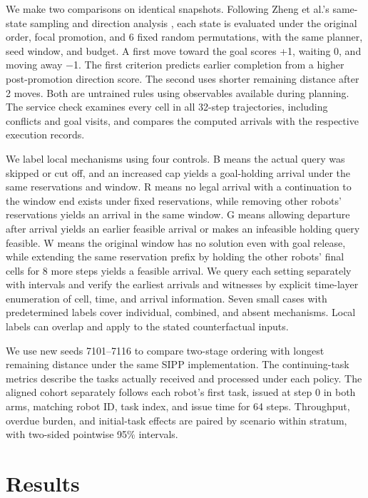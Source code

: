 \documentclass{article}
\begin{document}
We make two comparisons on identical snapshots. Following Zheng et al.'s same-state sampling and direction analysis \citep[Sec.~6]{zheng2026}, each state is evaluated under the original order, focal promotion, and 6 fixed random permutations, with the same planner, seed window, and budget. A first move toward the goal scores +1, waiting 0, and moving away \ensuremath{-}1. The first criterion predicts earlier completion from a higher post-promotion direction score. The second uses shorter remaining distance after 2 moves. Both are untrained rules using observables available during planning. The service check examines every cell in all 32-step trajectories, including conflicts and goal visits, and compares the computed arrivals with the respective execution records.

We label local mechanisms using four controls. B means the actual query was skipped or cut off, and an increased cap yields a goal-holding arrival under the same reservations and window. R means no legal arrival with a continuation to the window end exists under fixed reservations, while removing other robots' reservations yields an arrival in the same window. G means allowing departure after arrival yields an earlier feasible arrival or makes an infeasible holding query feasible. W means the original window has no solution even with goal release, while extending the same reservation prefix by holding the other robots' final cells for 8 more steps yields a feasible arrival. We query each setting separately with intervals and verify the earliest arrivals and witnesses by explicit time-layer enumeration of cell, time, and arrival information. Seven small cases with predetermined labels cover individual, combined, and absent mechanisms. Local labels can overlap and apply to the stated counterfactual inputs.

We use new seeds 7101--7116 to compare two-stage ordering with longest remaining distance under the same SIPP implementation. The continuing-task metrics describe the tasks actually received and processed under each policy. The aligned cohort separately follows each robot's first task, issued at step 0 in both arms, matching robot ID, task index, and issue time for 64 steps. Throughput, overdue burden, and initial-task effects are paired by scenario within stratum, with two-sided pointwise 95\% intervals.

\section{Results}
\end{document}
